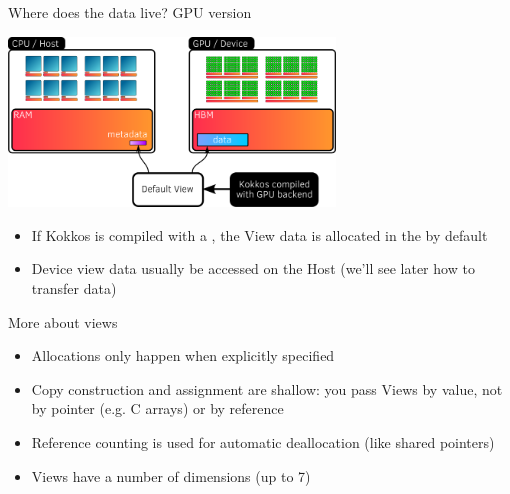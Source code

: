 \documentclass[
    aspectratio=169,
]{beamer}
\begin{document}
\begin{frame}{Where does the data live? GPU version}
    \begin{center}
        \includegraphics[width=0.65\textwidth]{device_view_memory.png}
    \end{center}
    \begin{itemize}
        \item If Kokkos is compiled with a , the View data is allocated in the  by default
        \item Device view data usually  be accessed on the Host (we'll see later how to transfer data)
    \end{itemize}
\end{frame}


\begin{frame}{More about views}
    \begin{itemize}
        \item Allocations only happen when explicitly specified
        \item Copy construction and assignment are shallow: you pass Views by value, not by pointer (e.g. C arrays) or by reference
        \item Reference counting is used for automatic deallocation (like shared pointers)
        \item Views have a  number of dimensions (up to 7)
    \end{itemize}
\end{frame}

\end{document}
